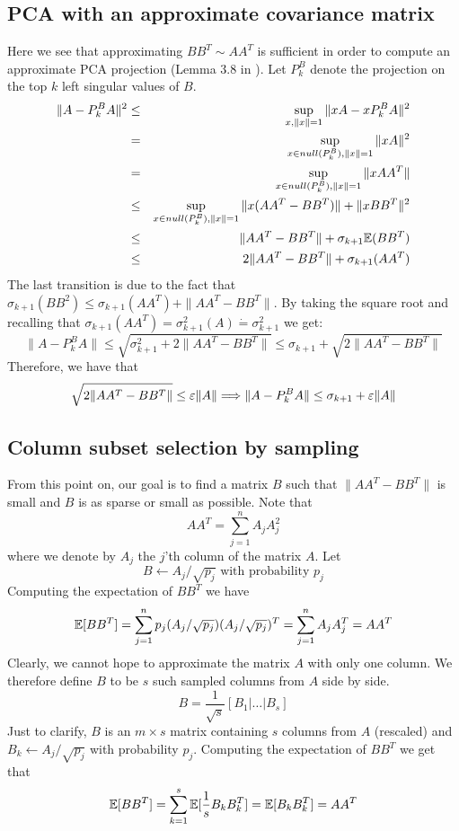 \documentclass{article}
\begin{document}
\subsection*{PCA with an approximate covariance matrix}
Here we see that approximating $BB^T \sim AA^T$ is sufficient in order to compute an approximate PCA projection (Lemma 3.8 in \cite{rvSamplingFromLargeMatrices2007}).
Let $P_k^B$ denote the projection on the top $k$ left singular values of $B$.  
\begin{eqnarray}
\|A - P_k^B A\|^2 &\le& \sup_{x, \|x\|=1} \|xA - xP_k^B A\|^2 \\
&=& \sup_{x \in null(P_k^B), \|x\|=1} \|xA\|^2 \\
&=& \sup_{x \in null(P_k^B), \|x\|=1} \|xAA^T\| \\
&\le& \sup_{x \in null(P_k^B), \|x\|=1} \|x(AA^T-BB^T)\|  + \|xBB^T\|^2\\
&\le& \|AA^T - BB^T\| + \sigma_{k+1}{\mathbb E}(BB^T)\\
&\le& 2\|AA^T - BB^T\| + \sigma_{k+1}(AA^T)
\end{eqnarray}
The last transition is due to the fact that $ \sigma_{k+1}(BB^2) \le  \sigma_{k+1}(AA^T) + \|AA^T - BB^T\|$.
By taking the square root and recalling that $\sigma_{k+1}(AA^T) = \sigma_{k+1}^2(A)  \dot{=}  \sigma_{k+1}^2$ we get:
\[
\|A - P_k^B A\| \le \sqrt{\sigma_{k+1}^2 + 2\|AA^T - BB^T\|} \le \sigma_{k+1} +\sqrt{2\|AA^T - BB^T\|}
\]
Therefore, we have that 
\[
\sqrt{2\|AA^T - BB^T\|} \le \varepsilon\|A\| \Longrightarrow \|A - P_k^BA\| \le \sigma_{k+1}+\varepsilon\|A\|
\]

\subsection*{Column subset selection by sampling}
From this point on, our goal is to find a matrix $B$ such that $\|AA^T - BB^T\|$ is small and $B$ is as sparse or small as possible.
Note that 
\[
AA^T = \sum_{j=1}^{n}A_jA_j^2
\]
where we denote by $A_j$ the $j$'th column of the matrix $A$.
Let 
\[
B \leftarrow A_j/\sqrt{p_j} \mbox{ with probability } p_j
\]
Computing the expectation of $BB^T$ we have 
\[
{\mathbb E}[BB^T] = \sum_{j=1}^{n} p_j (A_j/\sqrt{p_j})(A_j/\sqrt{p_j})^T = \sum_{j=1}^{n} A_jA_j^T = AA^T
\]
Clearly, we cannot hope to approximate the matrix $A$ with only one column. 
We therefore define $B$ to be $s$ such sampled columns from $A$ side by side.
\[
B = \frac{1}{\sqrt{s}}[B_1 | \ldots | B_s]
\]
Just to clarify, $B$ is an $m \times s$ matrix containing $s$ columns from $A$ (rescaled) and $B_k \leftarrow A_j/\sqrt{p_j}$ with probability $p_j$.
Computing the expectation of $BB^T$ we get that 
\[
{\mathbb E}[BB^T] = \sum_{k=1}^{s} {\mathbb E}[\frac{1}{s}B_kB_k^T] = {\mathbb E}[B_kB_k^T] = AA^T
\] 
\end{document}
